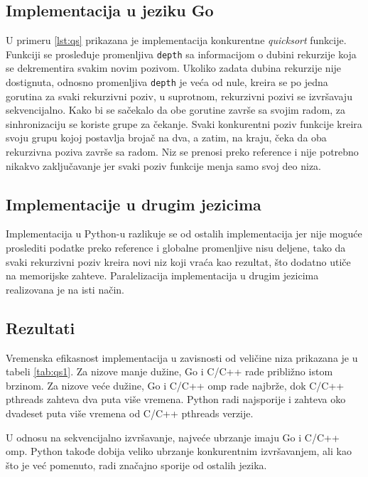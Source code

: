 \documentclass[12pt,oneside]{memoir}
\begin{document}
\subsection{Implementacija u jeziku Go}
\label{qs:go}
U primeru \ref{lst:qs} prikazana je implementacija  konkurentne \textit{quicksort} funkcije. Funkciji se prosleđuje promenljiva \texttt{depth} sa informacijom o dubini rekurzije koja se dekrementira svakim novim pozivom. Ukoliko zadata dubina rekurzije nije dostignuta, odnosno promenljiva \texttt{depth} je veća od nule, kreira se po jedna gorutina za svaki rekurzivni poziv, u suprotnom, rekurzivni pozivi se izvršavaju sekvencijalno. Kako bi se sačekalo da obe gorutine završe sa svojim radom, za sinhronizaciju se koriste grupe za čekanje. Svaki konkurentni poziv funkcije kreira svoju grupu kojoj postavlja brojač na dva, a zatim, na kraju, čeka da oba rekurzivna poziva završe sa radom. Niz se prenosi preko reference i nije potrebno nikakvo zaključavanje jer svaki poziv funkcije menja samo svoj deo niza.

\subsection{Implementacije u drugim jezicima}
Implementacija u Python-u razlikuje se od ostalih implementacija jer nije moguće proslediti podatke preko reference i globalne promenljive nisu deljene, tako da svaki rekurzivni poziv kreira novi niz koji vraća kao rezultat, što dodatno utiče na memorijske zahteve. Paralelizacija implementacija u drugim jezicima realizovana je na isti način. 

\subsection{Rezultati}\label{qs:rez}

Vremenska efikasnost implementacija u zavisnosti od veličine niza prikazana je u tabeli \ref{tab:qs1}. Za nizove manje dužine, Go i C/C++ rade približno istom brzinom. Za nizove veće dužine, Go i C/C++ omp rade najbrže, dok C/C++ pthreads zahteva dva puta više vremena. Python radi najsporije i zahteva oko dvadeset puta više vremena od C/C++ pthreads verzije. 

U odnosu na sekvencijalno izvršavanje, najveće ubrzanje imaju Go i C/C++ omp. Python takođe dobija veliko ubrzanje konkurentnim izvršavanjem, ali kao što je već pomenuto, radi značajno sporije od ostalih jezika. 
\end{document}
